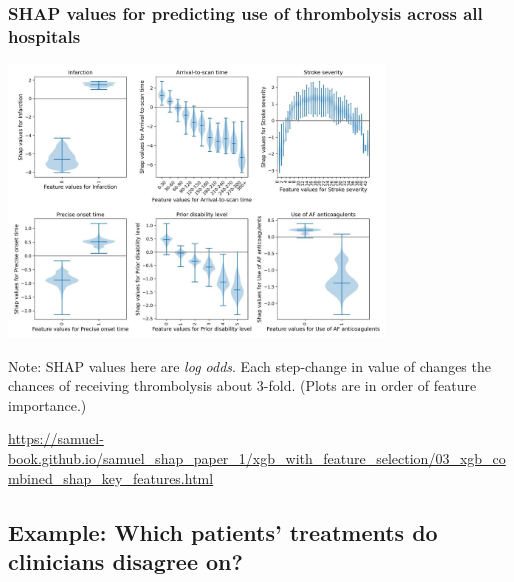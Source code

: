 \documentclass[xcolor={usenames,dvipsnames}]{beamer}
\newcommand{\smallurl}[1]{\textcolor{blue}{\fontsize{4pt}{4.8pt}\selectfont \url{#1}}}
\begin{document}

\begin{frame}
\frametitle{SHAP values for predicting use of thrombolysis across all hospitals}



\vspace{-0.5em}

\begin{center}
    \includegraphics[width=0.75\textwidth]{./images/shap_violins}
\end{center}


\tiny{Note: SHAP values here are \emph{log odds}. Each step-change in value of  changes the chances of receiving thrombolysis about 3-fold. (Plots are in order of feature importance.)}


\smallurl{https://samuel-book.github.io/samuel_shap_paper_1/xgb_with_feature_selection/03_xgb_combined_shap_key_features.html}

\end{frame}






\subsection{Example: Which patients' treatments do clinicians disagree on?} 
\end{document}
